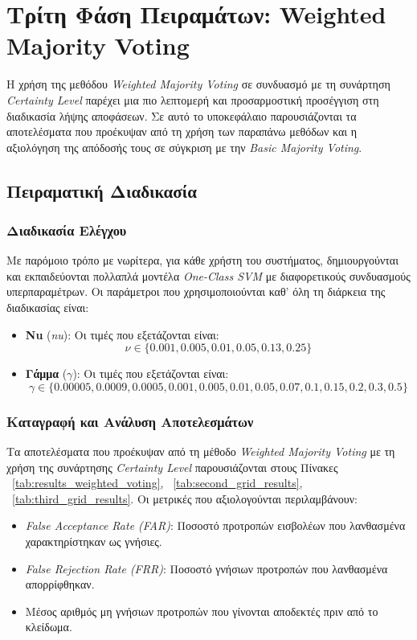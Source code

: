 \section{Τρίτη Φάση Πειραμάτων: Weighted Majority Voting}
\label{sec:experiments_phase3}

Η χρήση της μεθόδου \emph{Weighted Majority Voting} σε συνδυασμό με τη συνάρτηση \emph{Certainty Level} παρέχει μια πιο λεπτομερή και προσαρμοστική προσέγγιση στη διαδικασία λήψης αποφάσεων. Σε αυτό το υποκεφάλαιο παρουσιάζονται τα αποτελέσματα που προέκυψαν από τη χρήση των παραπάνω μεθόδων και η αξιολόγηση της απόδοσής τους σε σύγκριση με την \emph{Basic Majority Voting}.

\subsection{Πειραματική Διαδικασία}
\subsubsection{Διαδικασία Ελέγχου}
Με παρόμοιο τρόπο με νωρίτερα, για κάθε χρήστη του συστήματος, δημιουργούνται και εκπαιδεύονται πολλαπλά μοντέλα \emph{One-Class SVM} με διαφορετικούς συνδυασμούς υπερπαραμέτρων. Οι παράμετροι που χρησιμοποιούνται καθ' όλη τη διάρκεια της διαδικασίας είναι:

\begin{itemize}
    \item \textbf{Νu} (\emph{nu}): Οι τιμές που εξετάζονται είναι:
    \[
    \nu \in \{0.001, 0.005, 0.01, 0.05, 0.13, 0.25\}
    \]
    \item \textbf{Γάμμα} ($\gamma$): Οι τιμές που εξετάζονται είναι:
    \[
    \gamma \in \{0.00005, 0.0009, 0.0005, 0.001, 0.005, 0.01, 0.05, 0.07, 0.1, 0.15, 0.2, 0.3, 0.5\}
    \]
\end{itemize}

\subsubsection{Καταγραφή και Ανάλυση Αποτελεσμάτων}
Τα αποτελέσματα που προέκυψαν από τη μέθοδο \emph{Weighted Majority Voting} με τη χρήση της συνάρτησης \emph{Certainty Level} παρουσιάζονται στους Πίνακες ~\ref{tab:results_weighted_voting}, ~\ref{tab:second_grid_results}, ~\ref{tab:third_grid_results}. Οι μετρικές που αξιολογούνται περιλαμβάνουν:
\begin{itemize}
    \item \emph{False Acceptance Rate (FAR)}: Ποσοστό προτροπών εισβολέων που λανθασμένα χαρακτηρίστηκαν ως γνήσιες.
    \item \emph{False Rejection Rate (FRR)}: Ποσοστό γνήσιων προτροπών που λανθασμένα απορρίφθηκαν.
    \item Μέσος αριθμός μη γνήσιων προτροπών που γίνονται αποδεκτές πριν από το κλείδωμα.
\end{itemize}

